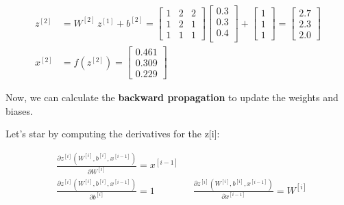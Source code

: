 \documentclass[12pt]{article}
\begin{document}
\begin{enumerate}
\begin{equation*}
    \begin{aligned}
        z^{[2]} &= W^{[2]} \, z^{[1]} + b^{[2]} = \begin{bmatrix}
            1 & 2 & 2 \\
            1 & 2 & 1 \\
            1 & 1 & 1
        \end{bmatrix} \begin{bmatrix}
            0.3 \\  
            0.3 \\
            0.4 \\
        \end{bmatrix} + \begin{bmatrix}
            1 \\
            1 \\
            1
        \end{bmatrix} = \begin{bmatrix}
            2.7 \\
            2.3 \\
            2.0
        \end{bmatrix} \\
        x^{[2]} &= f\left(z^{[2]}\right) = \begin{bmatrix}
            0.461 \\
            0.309 \\
            0.229
        \end{bmatrix}
    \end{aligned}
\end{equation*}

\vspace{10pt}
Now, we can calculate the \textbf{backward propagation} to update the weights and biases.

\newpage
Let's star by computing the derivatives for the z[i]:
    
    \begin{equation*}
        \begin{aligned}
            &\frac{\partial z^{[i]}(W^{[i]}, b^{[i]}, x^{[i-1]})}{\partial W^{[i]}} = x^{[i-1]}\\
            &\frac{\partial z^{[i]}(W^{[i]}, b^{[i]}, x^{[i-1]})}{\partial b^{[i]}} = 1 \qquad \quad \quad \frac{\partial z^{[i]}(W^{[i]}, b^{[i]}, x^{[i-1]})}{\partial x^{[i-1]}} = W^{[i]}\\
        \end{aligned}
    \end{equation*}


\end{enumerate}
\end{document}
